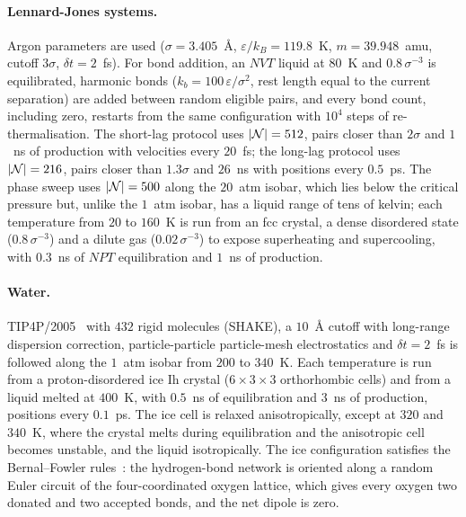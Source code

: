 \paragraph{Lennard-Jones systems.}
Argon parameters are used ($\sigma = 3.405$~\AA{}, $\varepsilon/k_{B} = 119.8$~K, $m = 39.948$~amu, cutoff $3\sigma$, $\delta t = 2$~fs).
For bond addition, an $NVT$ liquid at $80$~K and $0.8\,\sigma^{-3}$ is equilibrated, harmonic bonds ($k_{b} = 100\,\varepsilon/\sigma^{2}$, rest length equal to the current separation) are added between random eligible pairs, and every bond count, including zero, restarts from the same configuration with $10^{4}$ steps of re-thermalisation.
The short-lag protocol uses $|\mathcal{N}| = 512$, pairs closer than $2\sigma$ and $1$~ns of production with velocities every $20$~fs; the long-lag protocol uses $|\mathcal{N}| = 216$, pairs closer than $1.3\sigma$ and $26$~ns with positions every $0.5$~ps.
The phase sweep uses $|\mathcal{N}| = 500$ along the $20$~atm isobar, which lies below the critical pressure but, unlike the $1$~atm isobar, has a liquid range of tens of kelvin; each temperature from $20$ to $160$~K is run from an fcc crystal, a dense disordered state ($0.8\,\sigma^{-3}$) and a dilute gas ($0.02\,\sigma^{-3}$) to expose superheating and supercooling, with $0.3$~ns of $NPT$ equilibration and $1$~ns of production.

\paragraph{Water.}
TIP4P/2005~\cite{abascal2005} with $432$ rigid molecules (SHAKE), a $10$~\AA{} cutoff with long-range dispersion correction, particle-particle particle-mesh electrostatics and $\delta t = 2$~fs is followed along the $1$~atm isobar from $200$ to $340$~K.
Each temperature is run from a proton-disordered ice Ih crystal ($6 \times 3 \times 3$ orthorhombic cells) and from a liquid melted at $400$~K, with $0.5$~ns of equilibration and $3$~ns of production, positions every $0.1$~ps.
The ice cell is relaxed anisotropically, except at $320$ and $340$~K, where the crystal melts during equilibration and the anisotropic cell becomes unstable, and the liquid isotropically.
The ice configuration satisfies the Bernal--Fowler rules~\cite{bernal1933}: the hydrogen-bond network is oriented along a random Euler circuit of the four-coordinated oxygen lattice, which gives every oxygen two donated and two accepted bonds, and the net dipole is zero.

